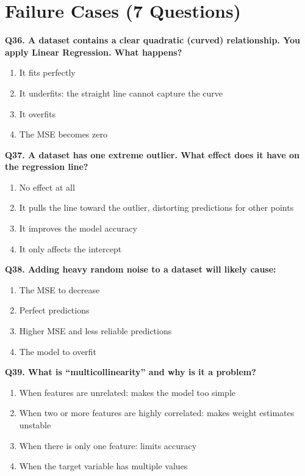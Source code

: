 \documentclass[12pt, a4paper]{article}
\newcommand{\question}[1]{\vspace{0.6em}\noindent\textbf{#1}}
\begin{document}
\section{Failure Cases (7 Questions)}

\question{Q36. A dataset contains a clear quadratic (curved) relationship. You apply Linear Regression. What happens?}
\begin{enumerate}[label=\alph*)]
    \item It fits perfectly
    \item It underfits: the straight line cannot capture the curve
    \item It overfits
    \item The MSE becomes zero
\end{enumerate}

\question{Q37. A dataset has one extreme outlier. What effect does it have on the regression line?}
\begin{enumerate}[label=\alph*)]
    \item No effect at all
    \item It pulls the line toward the outlier, distorting predictions for other points
    \item It improves the model accuracy
    \item It only affects the intercept
\end{enumerate}

\question{Q38. Adding heavy random noise to a dataset will likely cause:}
\begin{enumerate}[label=\alph*)]
    \item The MSE to decrease
    \item Perfect predictions
    \item Higher MSE and less reliable predictions
    \item The model to overfit
\end{enumerate}

\question{Q39. What is ``multicollinearity'' and why is it a problem?}
\begin{enumerate}[label=\alph*)]
    \item When features are unrelated: makes the model too simple
    \item When two or more features are highly correlated: makes weight estimates unstable
    \item When there is only one feature: limits accuracy
    \item When the target variable has multiple values
\end{enumerate}
\end{document}
